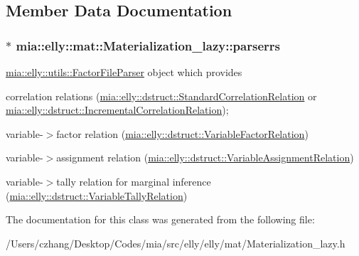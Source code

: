 \subsection{Member Data Documentation}
\hypertarget{classmia_1_1elly_1_1mat_1_1_materialization__lazy_a3425cb0aefa4c9423085c2b164aaacd4}{
\subsubsection[{parserrs}]{$\ast$ mia\-::elly\-::mat\-::\-Materialization\-\_\-lazy\-::parserrs}}\label{classmia_1_1elly_1_1mat_1_1_materialization__lazy_a3425cb0aefa4c9423085c2b164aaacd4}
\hyperlink{classmia_1_1elly_1_1utils_1_1_factor_file_parser}{mia\-::elly\-::utils\-::\-Factor\-File\-Parser} object which provides
\begin{DoxyItemize}
\item correlation relations (\hyperlink{classmia_1_1elly_1_1dstruct_1_1_standard_correlation_relation}{mia\-::elly\-::dstruct\-::\-Standard\-Correlation\-Relation} or \hyperlink{classmia_1_1elly_1_1dstruct_1_1_incremental_correlation_relation}{mia\-::elly\-::dstruct\-::\-Incremental\-Correlation\-Relation});
\item variable-\/$>$factor relation (\hyperlink{classmia_1_1elly_1_1dstruct_1_1_variable_factor_relation}{mia\-::elly\-::dstruct\-::\-Variable\-Factor\-Relation})
\item variable-\/$>$assignment relation (\hyperlink{classmia_1_1elly_1_1dstruct_1_1_variable_assignment_relation}{mia\-::elly\-::dstruct\-::\-Variable\-Assignment\-Relation})
\item variable-\/$>$tally relation for marginal inference (\hyperlink{classmia_1_1elly_1_1dstruct_1_1_variable_tally_relation}{mia\-::elly\-::dstruct\-::\-Variable\-Tally\-Relation}) 
\end{DoxyItemize}

The documentation for this class was generated from the following file\-:\begin{DoxyCompactItemize}
\item 
/\-Users/czhang/\-Desktop/\-Codes/mia/src/elly/elly/mat/Materialization\-\_\-lazy.\-h\end{DoxyCompactItemize}

